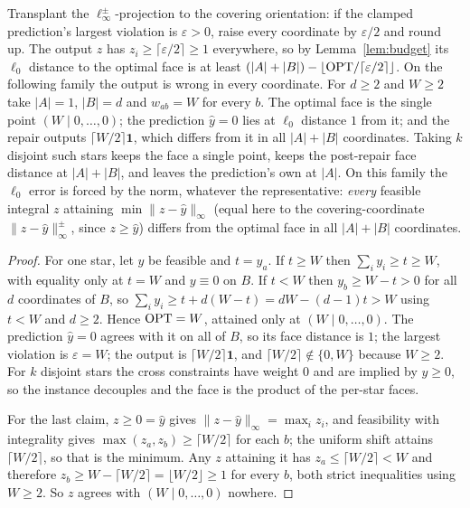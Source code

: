 \begin{observation}\label{obs:shift}
Transplant the $\ell_\infty^\pm$-projection to the covering orientation: if the clamped
prediction's largest violation is $\varepsilon > 0$, raise every coordinate by $\varepsilon/2$ and
round up. The output $z$ has $z_i \ge \lceil \varepsilon/2 \rceil \ge 1$ everywhere, so by
Lemma~\ref{lem:budget} its $\ell_0$ distance to the optimal face is at least
$(|A|+|B|) - \lfloor \mathrm{OPT} / \lceil \varepsilon/2 \rceil \rfloor$. On the following family the
output is wrong in every coordinate. For $d \ge 2$ and $W \ge 2$ take $|A| = 1$, $|B| = d$ and
$w_{ab} = W$ for every $b$. The optimal face is the single point $(W \mid 0, \dots, 0)$; the prediction
$\hat y = 0$ lies at $\ell_0$ distance $1$ from it; and the repair outputs
$\lceil W/2 \rceil \mathbf{1}$, which differs from it in all $|A| + |B|$ coordinates. Taking $k$ disjoint such stars keeps the face a single point, keeps the post-repair
face distance at $|A| + |B|$, and leaves the prediction's own at $|A|$. On this family the
$\ell_0$ error is forced by the norm, whatever the representative:
\emph{every} feasible integral $z$ attaining $\min \|z - \hat y\|_\infty$ (equal here to the
covering-coordinate $\|z - \hat y\|_\infty^\pm$, since $z \ge \hat y$) differs from the
optimal face in all $|A| + |B|$ coordinates.
\end{observation}
\begin{proof}
For one star, let $y$ be feasible and $t = y_a$. If $t \ge W$ then $\sum_i y_i \ge t \ge W$, with
equality only at $t = W$ and $y \equiv 0$ on $B$. If $t < W$ then $y_b \ge W - t > 0$ for all $d$
coordinates of $B$, so $\sum_i y_i \ge t + d(W-t) = dW - (d-1)t > W$ using $t < W$ and $d \ge 2$.
Hence $\mathrm{OPT} = W$, attained only at $(W \mid 0,\dots,0)$. The prediction $\hat y = 0$ agrees with it on
all of $B$, so its face distance is $1$; the largest violation is $\varepsilon = W$; the output
is $\lceil W/2 \rceil \mathbf{1}$, and $\lceil W/2 \rceil \notin \{0, W\}$ because $W \ge 2$. For
$k$ disjoint stars the cross constraints have weight $0$ and are implied by $y \ge 0$, so the
instance decouples and the face is the product of the per-star faces.

For the last claim, $z \ge 0 = \hat y$ gives $\|z - \hat y\|_\infty = \max_i z_i$, and
feasibility with integrality gives $\max(z_a, z_b) \ge \lceil W/2 \rceil$ for each $b$; the uniform
shift attains $\lceil W/2 \rceil$, so that is the minimum. Any $z$ attaining it has
$z_a \le \lceil W/2 \rceil < W$ and therefore $z_b \ge W - \lceil W/2 \rceil = \lfloor W/2 \rfloor
\ge 1$ for every $b$, both strict inequalities using $W \ge 2$. So $z$ agrees with
$(W \mid 0,\dots,0)$ nowhere.
\end{proof}

